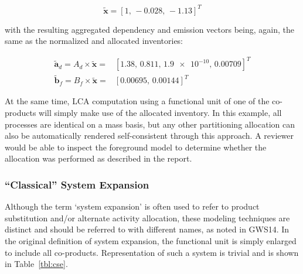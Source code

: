 \begin{equation}
  \tilde{\mathbf{x}} = [1,\,-0.028,\,-1.13]^T
\end{equation}

with the resulting aggregated dependency and emission vectors being, again, the same as the normalized and allocated inventories:

\begin{eqnarray}
  \tilde{\mathbf{a}}_d = A_d\times \tilde{\mathbf{x}} = & [1.38,\, 0.811,\,\num{1.9e-10},\,0.00709]^T \\
  \tilde{\mathbf{b}}_f = B_f\times \tilde{\mathbf{x}} = & [0.00695,\, 0.00144]^T
\end{eqnarray}

At the same time, LCA computation using a functional unit of one of the co-products will simply make use of the allocated inventory.  In this example, all processes are identical on a mass basis, but any other partitioning allocation can also be automatically rendered self-consistent through this approach.  A reviewer would be able to inspect the foreground model to determine whether the allocation was performed as described in the report.

\subsubsection{``Classical'' System Expansion}

Although the term `system expansion' is often used to refer to product substitution and/or alternate activity allocation, these modeling techniques are distinct and should be referred to with different names, as noted in GWS14.  In the original definition of system expansion, the functional unit is simply enlarged to include all co-products.  Representation of such a system is trivial and is shown in Table~\ref{tbl:cse}.

